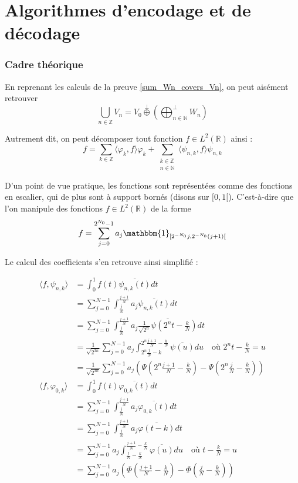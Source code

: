 
\newpage

\part{Algorithmes d'encodage et de décodage}

\section{Cadre théorique}

En reprenant les calculs de la preuve \ref{sum_Wn_covers_Vn}, on peut aisément retrouver $$\bigcup_{n \in \mathbb{Z}} V_n = V_0 \stackrel{\perp}{\oplus} \left(\bigoplus^{\bot}_{n \in \mathbb{N}} W_n\right)$$

Autrement dit, on peut décomposer tout fonction $f \in L^2(\mathbb{R})$ ainsi : $$f = \sum_{k \in \mathbb{Z}} \langle \varphi_k, f \rangle \varphi_k + \sum_{\substack{k \in \mathbb{Z} \\ n \in \mathbb{N}}} \langle \psi_{n, k}, f \rangle \psi_{n, k}$$

D'un point de vue pratique, les fonctions sont représentées comme des fonctions en escalier, qui de plus sont à support bornés (disons sur $[0, 1[$). C'est-à-dire que l'on manipule des fonctions $f \in L^2(\mathbb{R})$ de la forme $$f = \sum_{j = 0}^{2^{N_0} - 1} a_j \mathbbm{1}_{[2^{-N_0}j, 2^{-N_0}(j+1)[}$$

Le calcul des coefficients s'en retrouve ainsi simplifié :

\begin{align*}
	\langle f, \psi_{n, k} \rangle &= \int_0^1 f(t) \overline{\psi_{n, k}(t)} dt \\
	&= \sum_{j=0}^{N-1} \int_{\frac j N}^{\frac{j+1}N} a_j \overline{\psi_{n, k}(t)} dt \\
	&= \sum_{j=0}^{N-1} \int_{\frac j N}^{\frac{j+1}N} a_j \overline{\frac{1}{\sqrt{2^n}} \psi(2^n t - \frac{k}{N})} dt \\
	&= \frac{1}{\sqrt{2^{3n}}} \sum_{j=0}^{N-1} a_j \int_{2^n \frac{j}N - k}^{2^n\frac{j+1}N - \frac{k}{N}} \overline{\psi(u)} du \quad \text{où $2^nt - \frac{k}{N} = u$} \\
	&= \frac{1}{\sqrt{2^{3n}}} \sum_{j=0}^{N-1} a_j \left(\Psi\left(2^n\frac{j+1}N - \frac{k}{N}\right) - \Psi\left(2^n\frac{j}N - \frac{k}{N}\right)\right) \\
	\langle f, \varphi_{0, k} \rangle &= \int_0^1 f(t) \overline{\varphi_{0, k}(t)} dt \\
	&= \sum_{j=0}^{N-1} \int_{\frac j N}^{\frac{j+1}N} a_j \overline{\varphi_{0, k}(t)} dt \\
	&= \sum_{j=0}^{N-1} \int_{\frac j N}^{\frac{j+1}N} a_j \overline{\varphi(t - k)} dt \\
	&= \sum_{j=0}^{N-1} a_j \int_{\frac{j}N - \frac{k}{N}}^{\frac{j+1}N - \frac{k}{N}} \overline{\varphi(u)} du \quad \text{où $t - \frac{k}{N} = u$} \\
	&= \sum_{j=0}^{N-1} a_j \left(\Phi\left(\frac{j+1}N - \frac{k}{N}\right) - \Phi\left(\frac{j}N - \frac{k}{N}\right)\right)
\end{align*}

